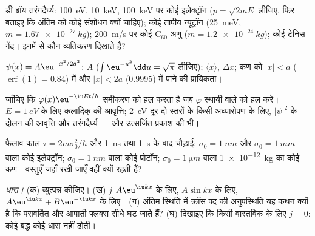 \begin{exercise}[$\star$]\label{exo:b2:schrodinger-wave-functions:1}
डी ब्रॉय तरंगदैर्घ्य: \qty{100}{eV}, \qty{10}{keV},
\qty{100}{keV} पर कोई इलेक्ट्रॉन ($p = \sqrt{2mE}$ लीजिए, फिर बताइए कि अंतिम को कोई
संशोधन क्यों चाहिए); कोई तापीय न्यूट्रॉन (\qty{25}{meV}, $m = \qty{1.67e-27}{kg}$); \qty{200}{m/s} पर कोई
C$_{60}$ अणु ($m = \qty{1.2e-24}{kg}$); कोई टेनिस
गेंद। इनमें से कौन व्यतिकरण दिखाते हैं?
\end{exercise}

\begin{exercise}[$\star$]\label{exo:b2:schrodinger-wave-functions:2}
$\psi(x) = A\eu^{-x^2/2a^2}$: $A$ ($\int\eu^{-u^2}\dd u = \sqrt\pi$ लीजिए);
$\langle x\rangle$, $\Delta x$; कण को
$|x| < a$ ($\operatorname{erf}(1) = 0.84$) में और $|x| < 2a$ ($0.9995$) में पाने की प्रायिकता।
\end{exercise}

\begin{exercise}[$\star$]\label{exo:b2:schrodinger-wave-functions:3}
जाँचिए कि $\varphi(x)\eu^{-\iu Et/\hbar}$ समीकरण को हल करता है जब $\varphi$
स्थायी वाले को हल करे। $E = \qty{1}{eV}$ के लिए कलादिक् की आवृत्ति;
\qty{2}{eV} दूर दो स्तरों के किसी अध्यारोपण के लिए, $|\psi|^2$ के दोलन की
आवृत्ति और तरंगदैर्घ्य --- और उत्सर्जित प्रकाश
की भी।
\end{exercise}

\begin{exercise}[$\star$]\label{exo:b2:schrodinger-wave-functions:4}
फैलाव काल $\tau = 2m\sigma_0^2/\hbar$ और \qty{1}{ns} तथा
\qty{1}{s} के बाद चौड़ाई: $\sigma_0 = \qty{1}{nm}$ और $\sigma_0 = \qty{1}{mm}$ वाला कोई इलेक्ट्रॉन;
$\sigma_0 = \qty{1}{nm}$ वाला कोई प्रोटॉन; $\sigma_0 = \qty{1}{\micro m}$ वाला \qty{1e-12}{kg} का कोई
कण। वस्तुएँ जहाँ रखी जाएँ वहीं क्यों रहती हैं?
\end{exercise}

\begin{exercise}[$\star\star$]\label{exo:b2:schrodinger-wave-functions:5}
\emph{धारा।} (क)  व्युत्पन्न कीजिए। (ख) $j$
$A\eu^{\iu kx}$ के लिए, $A\sin kx$ के लिए, $A\eu^{\iu kx} + B\eu^{-\iu kx}$ के लिए। (ग) अंतिम स्थिति में
क्रॉस पद की अनुपस्थिति यह कथन क्यों है कि
परावर्तित और आपाती फ्लक्स सीधे घट जाते हैं? (घ) दिखाइए कि किसी वास्तविक
 के लिए $j = 0$: कोई बद्ध  कोई धारा नहीं ढोती।
\end{exercise}

